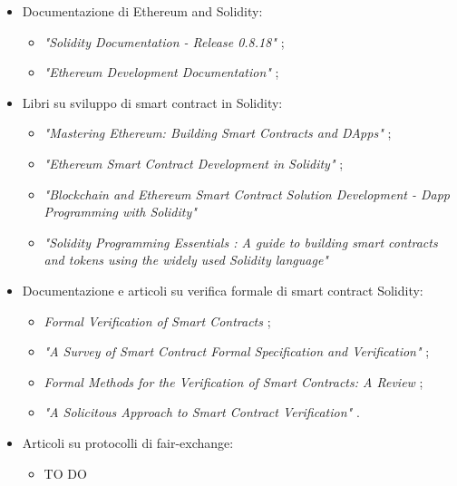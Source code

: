 \begin{itemize}
\begin{itemize}
\end{itemize}

\item Documentazione di Ethereum and Solidity:
\begin{itemize}

\item \textit{"Solidity Documentation - Release 0.8.18"} \cite{solidity0.8.18doc};

\item \textit{"Ethereum Development Documentation"} \cite{ethereum2024doc};

\end{itemize}

\item Libri su sviluppo di smart contract in Solidity:
\begin{itemize}

\item \textit{"Mastering Ethereum: Building Smart Contracts and DApps"} \cite{antonopoulos2018ethereum};

\item \textit{"Ethereum Smart Contract Development in Solidity"} \cite{zheng2020solidity};

\item \textit{"Blockchain and Ethereum Smart Contract Solution Development - Dapp Programming with Solidity"} \cite{zhang2022solidity}

\item \textit{"Solidity Programming Essentials : A guide to building smart contracts and tokens using the widely used Solidity language"} \cite{modi2022solidity}

\end{itemize}

\item Documentazione e articoli su verifica formale di smart contract Solidity:
\begin{itemize}

\item \textit{Formal Verification of Smart Contracts} \cite{ethereum2024scfv};

\item \textit{"A Survey of Smart Contract Formal Specification and Verification"} \cite{tolmach2021scfsvsurvey};

\item \textit{Formal Methods for the Verification of Smart Contracts: A Review} \cite{krichen2022scfmvreview};

\item \textit{"A Solicitous Approach to Smart Contract Verification"} \cite{otoni2023verification}.

\end{itemize}

\item Articoli su protocolli di fair-exchange:
\begin{itemize}
\item TO DO
\end{itemize}

\end{itemize}


